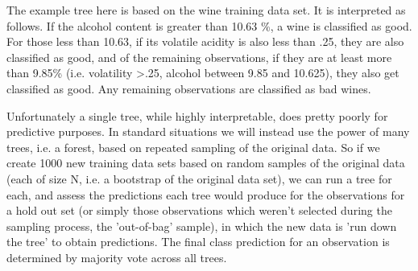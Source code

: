 \documentclass[english,nohyper,titlepage]{tufte-handout}\usepackage{knitr}
\begin{document}
The example tree here is based on the wine training data set. It is interpreted as follows.  If the alcohol content is greater than 10.63 \%, a wine is classified as good. For those less than 10.63, if its volatile acidity is also less than .25, they are also classified as good, and of the remaining observations, if they are at least more than 9.85\% (i.e. volatility >.25, alcohol between 9.85 and 10.625), they also get classified as good.  Any remaining observations are classified as bad wines.

Unfortunately a single tree, while highly interpretable, does pretty poorly for predictive purposes.  In standard situations we will instead use the power of many trees, i.e. a forest, based on repeated sampling of the original data.  So if we create 1000 new training data sets based on random samples of the original data (each of size N, i.e. a bootstrap of the original data set), we can run a tree for each, and assess the predictions each tree would produce for the observations for a hold out set (or simply those observations which weren't selected during the sampling process, the 'out-of-bag' sample), in which the new data is 'run down the tree' to obtain predictions. The final class prediction for an observation is determined by majority vote across all trees.
\end{document}
